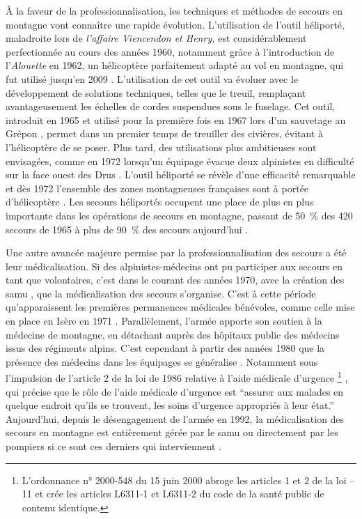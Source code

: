 À la faveur de la professionnalisation, les techniques et méthodes de
secours en montagne vont connaître une rapide évolution. L'utilisation
de l'outil héliporté, maladroite lors de \emph{l'affaire Viencendon et
  Henry,} est considérablement perfectionnée au cours des années 1960,
notamment grâce à l'introduction de l'\emph{Alouette } en
1962, un hélicoptère parfaitement adapté au vol en montagne, qui fut
utilisé jusqu'en 2009 \autocite{Elie2006, Lafond,
  Lafond2011b}. L'utilisation de cet outil va évoluer avec le
développement de solutions techniques, telles que le treuil,
remplaçant avantageusement les échelles de cordes suspendues sous le
fuselage. Cet outil, introduit en 1965 et utilisé pour la première
fois en 1967 lors d'un sauvetage au Grépon \autocite{Lafond2011a},
permet dans un premier temps de treuiller des civières, évitant à
l'hélicoptère de se poser. Plus tard, des utilisations plus
ambitieuses sont envisagées, comme en 1972 lorsqu'un équipage évacue
deux alpinistes en difficulté sur la face ouest des Drus
\autocite{Ministere2013}. L'outil héliporté se révèle d'une efficacité
remarquable et dès 1972 l'ensemble des zones montagneuses françaises
sont à portée d'hélicoptère \autocite{CFDLD}. Les secours héliportés
occupent une place de plus en plus importante dans les opérations de
secours en montagne, passant de 50~\% des 420 secours de 1965
\autocite{CFDLD} à plus de 90~\% des secours aujourd'hui
\autocite{Halle2007}.

Une autre avancée majeure permise par la professionnalisation des
secours a été leur médicalisation. Si des alpinistes-médecins ont pu
participer aux secours en tant que volontaires, c'est dans le courant
des années 1970, avec la création des \ac{samu} \autocite{Halle2007},
que la médicalisation des secours s'organise. C'est à cette période
qu’apparaissent les premières permanences médicales bénévoles, comme
celle mise en place en Isère en 1971
\autocite{Rocourt2014}. Parallèlement, l'armée apporte son soutien à
la médecine de montagne, en détachant auprès des hôpitaux public des
médecins issus des régiments alpins. C'est cependant à partir des
années 1980 que la présence des médecins dans les équipages se
généralise \autocite{CFDLD}. Notamment sous l'impulsion de l'article 2
de la loi de 1986 relative à l'aide médicale d'urgence
\footnote{L’ordonnance n° 2000-548 du 15 juin 2000 abroge les articles
  1 et 2 de la loi --11 et crée les articles L6311-1 et L6311-2
  du code de la santé public de contenu identique.}
\autocite{Rocourt2014}, qui précise que le rôle de l'aide médicale
d'urgence est \enquote{assurer aux malades \textelp{} en
  quelque endroit qu'ils se trouvent, les soins d'urgence appropriés à
  leur état.}  Aujourd'hui, depuis le désengagement de l'armée en
1992, la médicalisation des secours en montagne est entièrement gérée
par le \ac{samu} ou directement par les pompiers si ce sont ces
derniers qui interviennent \autocite{Rocourt2014, Halle2007}.


